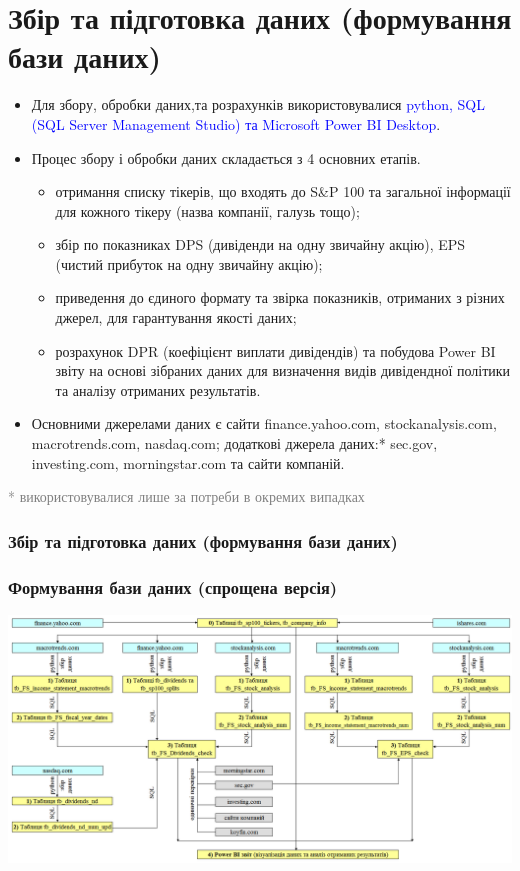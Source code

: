 \documentclass[aspectratio=169]{beamer}
\begin{document}
\section{Збір та підготовка даних (формування бази даних)}
\begin{frame}
\begin{itemize}
\item Для збору, обробки даних,та розрахунків використовувалися \textcolor{blue} {python, SQL (SQL Server Management Studio) та Microsoft Power BI Desktop}.
\bigskip
\item \alert {Процес збору і обробки даних} складається з 4 основних етапів.
\begin{itemize}
    \item[\textcolor{orange}{\textbullet}] отримання списку тікерів, що входять до S&P 100 та загальної інформації для кожного тікеру (назва компанії, галузь тощо);
    \item[\textcolor{orange}{\textbullet}] збір по показниках DPS (дивіденди на одну звичайну акцію), EPS (чистий прибуток на одну звичайну акцію);
    \item[\textcolor{orange}{\textbullet}] приведення до єдиного формату та звірка показників, отриманих з різних джерел, для гарантування якості даних;
    \item[\textcolor{orange}{\textbullet}] розрахунок DPR (коефіцієнт виплати дивідендів) та побудова Power BI звіту на основі зібраних даних для визначення видів дивідендної політики та аналізу отриманих результатів.
\end{itemize}
\bigskip
\item \alert {Основними джерелами даних} є сайти finance.yahoo.com, stockanalysis.com, macrotrends.com, nasdaq.com; додаткові джерела даних:* sec.gov, investing.com, morningstar.com та сайти компаній.
\end{itemize}
\bigskip
\scriptsize \textcolor{gray}{* використовувалися лише за потреби в окремих випадках} 
\frametitle{Збір та підготовка даних (формування бази даних)}

\end{frame}

\begin{frame}
\frametitle{Формування бази даних (спрощена версія)}
\begin{center}
\includegraphics[scale=0.35]{Data Flow full.png}
\end{center}
\end{frame}
\end{document}
